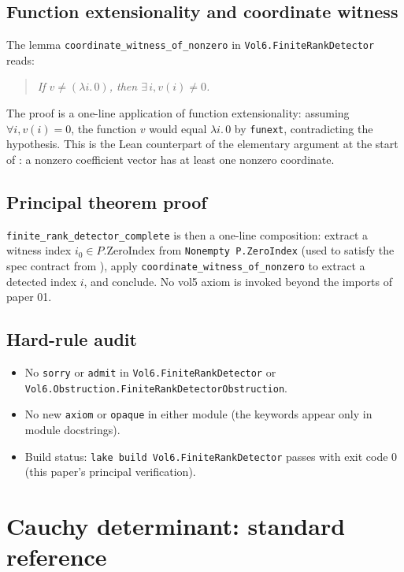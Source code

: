 \documentclass[12pt]{article}
\theoremstyle{definition}
\theoremstyle{remark}
\begin{document}
\subsection{Function extensionality and coordinate witness}

The lemma \texttt{coordinate\_witness\_of\_nonzero} in
\texttt{Vol6.FiniteRankDetector} reads:
\begin{quote}
\itshape If $v\neq(\lambda i.\,0)$, then $\exists\,i,v(i)\neq0$.
\end{quote}
The proof is a one-line application of function extensionality: assuming
$\forall i, v(i)=0$, the function $v$ would equal $\lambda i.\,0$ by
\texttt{funext}, contradicting the hypothesis. This is the Lean
counterpart of the elementary argument at the start of
: a nonzero coefficient vector has at least one
nonzero coordinate.

\subsection{Principal theorem proof}

\texttt{finite\_rank\_detector\_complete} is then a one-line composition:
extract a witness index $i_{0}\in P.\mathrm{ZeroIndex}$ from
\texttt{Nonempty P.ZeroIndex} (used to satisfy the spec contract from
\cite[Paper~02]{Vol6KB}), apply
\texttt{coordinate\_witness\_of\_nonzero} to extract a detected index
$i$, and conclude. No vol5 axiom is invoked beyond the imports of
paper 01.

\subsection{Hard-rule audit}

\begin{itemize}\itemsep0pt
  \item No \texttt{sorry} or \texttt{admit} in
        \texttt{Vol6.FiniteRankDetector} or
        \texttt{Vol6.Obstruction.FiniteRankDetectorObstruction}.
  \item No new \texttt{axiom} or \texttt{opaque} in either module
        (the keywords appear only in module docstrings).
  \item Build status: \texttt{lake build Vol6.FiniteRankDetector}
        passes with exit code 0 (this paper's principal verification).
\end{itemize}

\section{Cauchy determinant: standard reference}\label{app:cauchy-ref}
\end{document}
